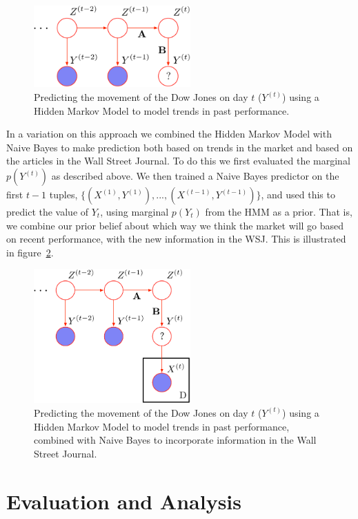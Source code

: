 \documentclass[10pt, twocolumn]{article}
\begin{document}
\begin{figure}
\center
\includegraphics[width=6cm]{figs/hmm-predict.pdf}
\caption{Predicting the movement of the Dow Jones on day $t$ ($Y^{(t)}$) using a Hidden Markov Model to model trends in past performance.}
\label{fig:hmm-predict}
\end{figure}

In a variation on this approach we combined the Hidden Markov Model with Naive Bayes to make prediction both based on trends in the market and based on the articles in the Wall Street Journal.
To do this we first evaluated the marginal $p(Y^{(t)})$ as described above.
We then trained a Naive Bayes predictor on the first $t-1$ tuples, $\{(X^{(1)},Y^{(1)}), ..., (X^{(t-1)},Y^{(t-1)})\}$, and used this to predict the value of $Y_{t}$, using marginal $p(Y_{t})$ from the HMM as a prior.
That is, we combine our prior belief about which way we think the market will go based on recent performance, with the new information in the WSJ.
This is illustrated in figure~\ref{fig:hmm-nb-predict}. 

\begin{figure}
\center
\includegraphics[width=6cm]{figs/hmm-nb-predict.pdf}
\caption{Predicting the movement of the Dow Jones on day $t$ ($Y^{(t)}$) using a Hidden Markov Model to model trends in past performance, combined with Naive Bayes to incorporate information in the Wall Street Journal.}
\label{fig:hmm-nb-predict}
\end{figure}

\section{Evaluation and Analysis}
\end{document}
